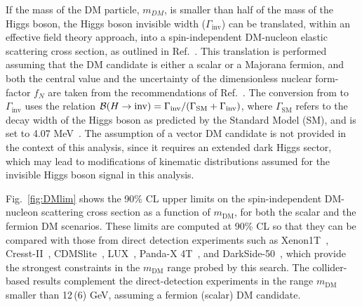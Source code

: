 If the mass of the DM particle, $m_{DM}$, is smaller than half
of the mass of the Higgs boson, the Higgs boson invisible width ($\Gamma_{\text{inv}}$) can be translated,
within an effective field theory approach, into a spin-independent
DM-nucleon elastic scattering cross section, as outlined in
Ref.~\cite{Djouadi:2011aa}. This translation is performed assuming
that the DM candidate is either a scalar or a Majorana fermion, and
both the central value and the uncertainty of the dimensionless
nuclear form-factor $f_{N}$ are taken from the recommendations of
Ref.~\cite{Hoferichter:2017olk}. The conversion from \brinv to
$\Gamma_{\text{inv}}$ uses the relation ${{\mathcal{B}(H\rightarrow\text{inv})} = \Gamma_{\text{inv}}
/ (\Gamma_{\mathrm{SM}}+\Gamma_{\text{inv}})}$, where
$\Gamma_{\mathrm{SM}}$ refers to the decay width of the Higgs boson as predicted by the Standard Model (SM), 
and is set to 4.07 MeV~\cite{Heinemeyer:2013tqa}.
The assumption of a vector DM candidate is not provided in the context of this analysis, since it
requires an extended dark Higgs sector, which may lead to
modifications of kinematic distributions assumed for the invisible
Higgs boson signal in this analysis.

Fig.~\ref{fig:DMlim} shows the 90\% CL upper
limits on the spin-independent DM-nucleon scattering cross section as
a function of $m_{\mathrm{DM}}$, for both the scalar and the fermion
DM scenarios. These limits are computed at 90\% CL so that they can
be compared with those from direct detection experiments such as
Xenon1T~\cite{Aprile:2018dbl}, Cresst-II~\cite{Angloher:2015ewa},
CDMSlite~\cite{Agnese:2015nto}, LUX~\cite{Akerib:2016vxi},
Panda-X 4T~\cite{PandaX-4T:2021bab}, and
DarkSide-50~\cite{Agnes:2018ves}, which provide the strongest
constraints in the $m_{\mathrm{DM}}$ range probed by this search. The
collider-based results complement the direct-detection experiments in
the range $m_{\mathrm{DM}}$ smaller than 12\,(6) GeV, assuming a
fermion (scalar) DM candidate.

